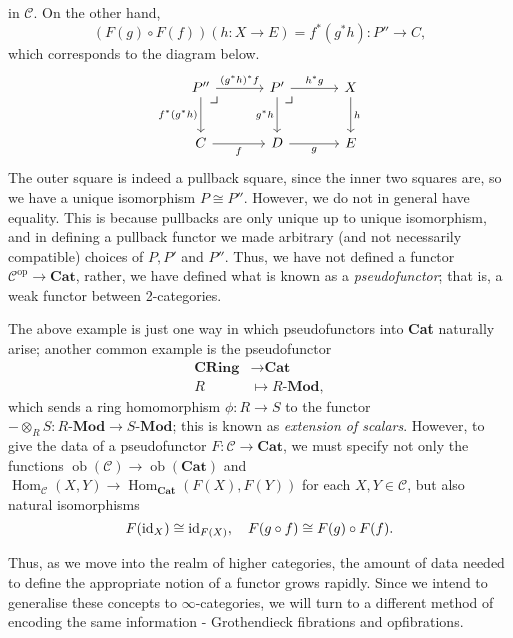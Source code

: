 \documentclass{MetricNotes2023}
\def\id{\ensuremath\text{id}}
\DeclareMathOperator{\Hom}{Hom}
\DeclareMathOperator{\ob}{ob}
\begin{document}
in \(\mathcal{C}\). On the other hand, 
\[(F(g)\circ F(f))(h : X \to E)=f^*(g^*h) : P'' \to C,\] which corresponds to the diagram below.
\[\begin{tikzcd}[column sep=8ex, row sep=6ex]
P'' \arrow[r, "(g^*h)^*f"] \arrow[d, swap, "f^*(g^*h)"] \arrow[dr, phantom, "\scalebox{1.3}{$\lrcorner$}" {xshift=-18pt, yshift=12pt}] & P' \arrow[r, "h^*g"] \arrow[d, swap, "g^*h"] \arrow[dr, phantom, "\scalebox{1.3}{$\lrcorner$}" {xshift=-18pt, yshift=12pt}] & X \arrow[d, "h"]  \\
C \arrow[r, swap, "f"]  & D \arrow[r, swap, "g"] & E
\end{tikzcd}\]
The outer square is indeed a pullback square, since the inner two squares are, so we have a unique isomorphism \(P \cong P''\). However, we do not in general have equality. This is because pullbacks are only unique up to unique isomorphism, and in defining a pullback functor we made arbitrary (and not necessarily compatible) choices of \(P, P'\) and \(P''\). Thus, we have not defined a functor \(\mathcal{C}^{\text{op}}\to \textbf{Cat}\), rather, we have defined what is known as a \textit{pseudofunctor}; that is, a weak functor between 2-categories. 

The above example is just one way in which pseudofunctors into \textbf{Cat} naturally arise; another common example is the pseudofunctor
\begin{align*}
\textbf{CRing}&\to \textbf{Cat}\\
R\; &\mapsto R \textbf{-Mod},
\end{align*}
which sends a ring homomorphism \(\phi : R \to S\) to the functor \(-\otimes_R S : R \textbf{-Mod}\to S \textbf{-Mod}\); this is known as \textit{extension of scalars}. However, to give the data of a pseudofunctor \(F : \mathcal{C} \to \textbf{Cat}\), we must specify not only the functions \(\ob(\mathcal{C})\to \ob(\textbf{Cat})\) and \(\Hom_\mathcal{C}(X, Y)\to \Hom_\textbf{Cat}(F(X), F(Y))\) for each \(X, Y \in \mathcal{C}\), but also natural isomorphisms
\[F(\id_X) \cong \id_{F(X)}, \quad F(g \circ f) \cong F(g) \circ F(f).\]

Thus, as we move into the realm of higher categories, the amount of data needed to define the appropriate notion of a functor grows rapidly. Since we intend to generalise these concepts to \(\infty\)-categories, we will turn to a different method of encoding the same information - Grothendieck fibrations and opfibrations.
\end{document}
